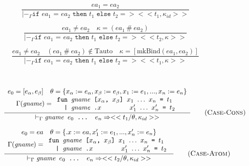 \documentclass[10pt]{../sigplanconf}
\newcommand{\nfrac}[2]{\frac{\displaystyle{#1}}{\displaystyle{#2}}}
\newcommand{\tagsc}[1]{\tag{\scshape #1}}
\begin{document}
\begin{figure}
  \begin{equation}
    \nfrac{
      ea_1 = ea_2
    }{
      |-_\Gamma \texttt{if $ea_1$ = $ea_2$ then $t_1$ else $t_2$} => <<t_1, \kappa_{id}>>
    } \tagsc{If-Eq}
  \end{equation}

  \begin{equation}
    \nfrac{
      ea_1 \neq ea_2 \quad \kappa = (ea_1\ \#\ ea_2)
    }{
      |-_\Gamma \texttt{if $ea_1$ = $ea_2$ then $t_1$ else $t_2$} => <<t_2, \kappa>>
    } \tagsc{If-Neq-False}
  \end{equation}

  \begin{equation}
    \nfrac{
      ea_1 \neq ea_2 \quad (ea_1\ \#\ ea_2) \not \in \textrm{Tauto} \quad \kappa = [\textrm{mkBind}(ea_1, ea_2)]
    }{
      |-_\Gamma \texttt{if $ea_1$ = $ea_2$ then $t_1$ else $t_2$} => <<t_1, \kappa>>
    } \tagsc{If-Neq-True}
  \end{equation}

  ~\newline

  \begin{equation}
    \nfrac{
      \begin{array}{c}
        e_0 = [e_\alpha, e_\beta] \quad \theta = \{ x_\alpha := e_\alpha, x_\beta := e_\beta, x_1 := e_1, ..., x_n := e_n \} \\
        \Gamma(\textit{gname}) =
        \begin{array}{l}
          \texttt{fun \textit{\rmfamily gname} [$x_\alpha$, $x_\beta$] $x_1$ $\ldots$ $x_n$ = $t_1$} \\
          \texttt{\ \ | \textit{\rmfamily gname}\ \texttt{.}$x$ \hspace{1.1cm} $x_1'$ $\ldots$ $x_n'$ = $t_2$} \\
        \end{array}
      \end{array}
    }{
      |-_\Gamma \texttt{\textit{\rmfamily gname} $e_0$ ... $e_n$} => <<t_1 / \theta, \kappa_{id} >>
    } \tagsc{Case-Cons}
  \end{equation}

  \begin{equation}
    \nfrac{
      \begin{array}{c}
        e_0 = ea \quad \theta = \{ .x := ea, x_1' := e_1, ..., x_n' := e_n \} \\
        \Gamma(\textit{gname}) =
        \begin{array}{l}
          \texttt{fun \textit{\rmfamily gname} [$x_\alpha$, $x_\beta$] $x_1$ $\ldots$ $x_n$ = $t_1$} \\
          \texttt{\ \ | \textit{\rmfamily gname}\ \texttt{.}$x$ \hspace{1.1cm} $x_1'$ $\ldots$ $x_n'$ = $t_2$} \\
        \end{array}
      \end{array}
    }{
      |-_\Gamma \texttt{\textit{\rmfamily gname} $e_0$ ... $e_n$} => <<t_2 / \theta, \kappa_{id}>>
    } \tagsc{Case-Atom}
  \end{equation}


\end{figure}
\end{document}
